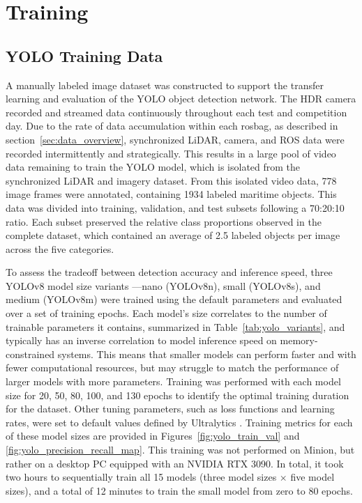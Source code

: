 \documentclass{erauthesis}
\begin{document}
\section{Training}

\subsection{YOLO Training Data} \label{sec:yolo_training_data}

A manually labeled image dataset was constructed to support the transfer learning and evaluation of the YOLO object detection network. 
The HDR camera recorded and streamed data continuously throughout each test and competition day. 
Due to the rate of data accumulation within each rosbag, as described in section~\ref{sec:data_overview}, synchronized LiDAR, camera, and ROS data were recorded intermittently and strategically.  
This results in a large pool of video data remaining to train the YOLO model, which is isolated from the synchronized LiDAR and imagery dataset. 
From this isolated video data, 778 image frames were annotated, containing 1934 labeled maritime objects.
This data was divided into training, validation, and test subsets following a 70:20:10 ratio.
Each subset preserved the relative class proportions observed in the complete dataset, which contained an average of 2.5 labeled objects per image across the five categories.

To assess the tradeoff between detection accuracy and inference speed, three YOLOv8 model size variants —nano (YOLOv8n), small (YOLOv8s), and medium (YOLOv8m) were trained using the default parameters and evaluated over a set of training epochs.
Each model’s size correlates to the number of trainable parameters it contains, summarized in Table~\ref{tab:yolo_variants}, and typically has an inverse correlation to model inference speed on memory-constrained systems.
This means that smaller models can perform faster and with fewer computational resources, but may struggle to match the performance of larger models with more parameters.
Training was performed with each model size for 20, 50, 80, 100, and 130 epochs to identify the optimal training duration for the dataset. Other tuning parameters, such as loss functions and learning rates, were set to default values defined by Ultralytics \cite{ultralytics}. 
Training metrics for each of these model sizes are provided in Figures~\ref{fig:yolo_train_val} and \ref{fig:yolo_precision_recall_map}.
This training was not performed on Minion, but rather on a desktop PC equipped with an NVIDIA RTX 3090. In total, it took two hours to sequentially train all 15 models (three model sizes $\times$ five model sizes), and a total of 12 minutes to train the small model from zero to 80 epochs.
\end{document}
